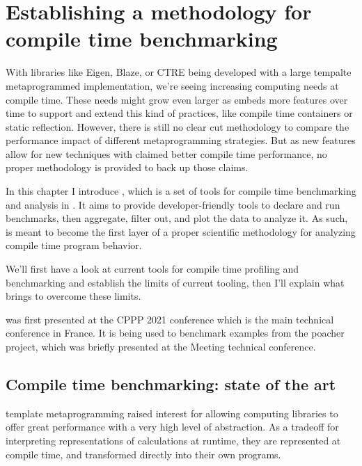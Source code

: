\documentclass[../../main.tex]{subfiles}
\begin{document}
\chapter{Establishing a methodology for compile time benchmarking}

With libraries like Eigen\cite{eigen}, Blaze\cite{blazelib}, or CTRE\cite{ctre}
being developed with a large tempalte metaprogrammed implementation, we're seeing
increasing computing needs at compile time. These needs might grow even larger
as \cpp embeds more features over time to support and extend this kind of
practices, like compile time containers\cite{more-constexpr-containers} or static
reflection\cite{static-reflection}. However, there is still no clear cut methodology
to compare the performance impact of different metaprogramming strategies. But
as new \cpp features allow for new techniques with claimed better compile time
performance, no proper methodology is provided to back up those claims.

In this chapter I introduce \ctbench, which is a set of tools for compile time
benchmarking and analysis in \cpp. It aims to provide developer-friendly tools
to declare and run benchmarks, then aggregate, filter out, and plot the data to
analyze it. As such, \ctbench is meant to become the first layer of a proper
scientific methodology for analyzing compile time program behavior.

We'll first have a look at current tools for compile time profiling and
benchmarking and establish the limits of current tooling, then I'll explain
what \ctbench brings to overcome these limits.

\ctbench was first presented at the CPPP 2021 conference\cite{ctbench-cppp21}
which is the main \cpp technical conference in France. It is being used to
benchmark examples from the poacher\cite{poacher} project, which was briefly
presented at the Meeting \cite{meetingcpp22} technical conference.

\section{Compile time benchmarking: state of the art}

\cpp template metaprogramming raised interest for allowing computing libraries to
offer great performance with a very high level of abstraction. As a tradeoff for
interpreting representations of calculations at runtime, they are represented at
compile time, and transformed directly into their own programs.
\end{document}
